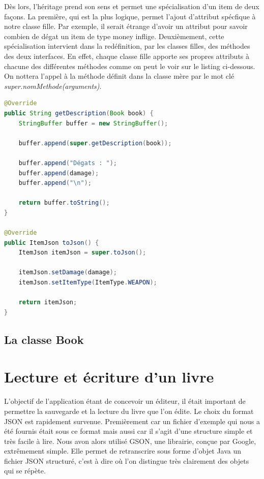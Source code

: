 			Dès lors, l'héritage prend son sens et permet une spécialisation d'un item de deux façons. La première, qui est la plus logique, permet l'ajout d'attribut spécfique à notre classe fille. Par exemple, il serait étrange d'avoir un attribut pour savoir combien de dégat un item de type money inflige. Deuxièmement, cette spécialisation intervient dans la redéfinition, par les classes filles, des méthodes des deux interfaces. En effet, chaque classe fille apporte ses propres attributs à chacune des différentes méthodes comme on peut le voir sur le listing ci-dessous. On nottera l'appel à la méthode définit dans la classe mère par le mot clé \textit{super.nomMethode(arguments)}.

\begin{lstlisting}[language=Java, caption=Exemple de spécialisation des items]
@Override
public String getDescription(Book book) {
	StringBuffer buffer = new StringBuffer();

	buffer.append(super.getDescription(book));

	buffer.append("Dégats : ");
	buffer.append(damage);
	buffer.append("\n");

	return buffer.toString();
}

@Override
public ItemJson toJson() {
	ItemJson itemJson = super.toJson();

	itemJson.setDamage(damage);
	itemJson.setItemType(ItemType.WEAPON);

	return itemJson;
}
\end{lstlisting}

		\subsection{La classe Book}



	\section{Lecture et écriture d'un livre}\label{Json}

		L'objectif de l'application étant de concevoir un éditeur, il était important de permettre la sauvegarde et la lecture du livre que l'on édite. Le choix du format JSON est rapidement survenue. Premièrement car un fichier d'exemple qui nous a été fournis était sous ce format mais aussi car il s'agit d'une structure simple et très facile à lire. Nous avon alors utilisé GSON, une librairie, conçue par Google, extrêmement simple. Elle permet de retranscrire sous forme d'objet Java un fichier JSON structuré, c'est à dire où l'on distingue très clairement des objets qui se répète.

